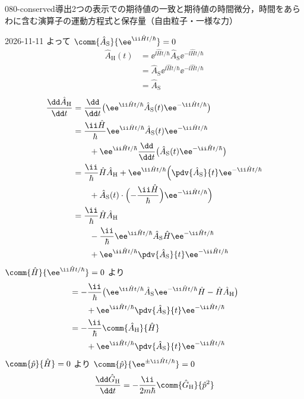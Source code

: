 \documentclass[uplatex,dvipdfmx,a4paper,11pt]{jsarticle}
\begin{document}
\begin{mondai}{080-conserved}{導出}{2つの表示での期待値の一致と期待値の時間微分，時間をあらわに含む演算子の運動方程式と保存量（自由粒子・一様な力）}
\begin{kotaeutsushi}{2026-11-11}
よって $\comm{\hat{A}_{\mathrm{S}}}{\ee^{\ii\hat{H}t/\hbar}}=0$
\begin{align*}
\hat{A}_{\mathrm{H}}(t)&=\ee^{\ii\hat{H}t/\hbar}\hat{A}_{\mathrm{S}}\ee^{-\ii\hat{H}t/\hbar}\\
&=\hat{A}_{\mathrm{S}}\ee^{\ii\hat{H}t/\hbar}\ee^{-\ii\hat{H}t/\hbar}\\
&=\hat{A}_{\mathrm{S}}
\end{align*}
\begin{align*}
\frac{\dd\hat{A}_{\mathrm{H}}}{\dd t}&=\frac{\dd}{\dd t}\bigl(\ee^{\ii\hat{H}t/\hbar}\hat{A}_{\mathrm{S}}(t)\ee^{-\ii\hat{H}t/\hbar}\bigr)\\
&=\frac{\ii\hat{H}}{\hbar}\ee^{\ii\hat{H}t/\hbar}\hat{A}_{\mathrm{S}}(t)\ee^{-\ii\hat{H}t/\hbar}\\
&\qquad+\ee^{\ii\hat{H}t/\hbar}\frac{\dd}{\dd t}\bigl(\hat{A}_{\mathrm{S}}(t)\ee^{-\ii\hat{H}t/\hbar}\bigr)\\
&=\frac{\ii}{\hbar}\hat{H}\hat{A}_{\mathrm{H}}+\ee^{\ii\hat{H}t/\hbar}\Bigl(\pdv{\hat{A}_{\mathrm{S}}}{t}\ee^{-\ii\hat{H}t/\hbar}\\
&\qquad+\hat{A}_{\mathrm{S}}(t)\cdot\Bigl(-\frac{\ii\hat{H}}{\hbar}\Bigr)\ee^{-\ii\hat{H}t/\hbar}\Bigr)\\
&=\frac{\ii}{\hbar}\hat{H}\hat{A}_{\mathrm{H}}\\
&\qquad-\frac{\ii}{\hbar}\ee^{\ii\hat{H}t/\hbar}\hat{A}_{\mathrm{S}}\hat{H}\ee^{-\ii\hat{H}t/\hbar}\\
&\qquad+\ee^{\ii\hat{H}t/\hbar}\pdv{\hat{A}_{\mathrm{S}}}{t}\ee^{-\ii\hat{H}t/\hbar}
\end{align*}
$\comm{\hat{H}}{\ee^{\ii\hat{H}t/\hbar}}=0$ より
\begin{align*}
&=-\frac{\ii}{\hbar}\bigl(\ee^{\ii\hat{H}t/\hbar}\hat{A}_{\mathrm{S}}\ee^{-\ii\hat{H}t/\hbar}\hat{H}-\hat{H}\hat{A}_{\mathrm{H}}\bigr)\\
&\qquad+\ee^{\ii\hat{H}t/\hbar}\pdv{\hat{A}_{\mathrm{S}}}{t}\ee^{-\ii\hat{H}t/\hbar}\\
&=-\frac{\ii}{\hbar}\comm{\hat{A}_{\mathrm{H}}}{\hat{H}}\\
&\qquad+\ee^{\ii\hat{H}t/\hbar}\pdv{\hat{A}_{\mathrm{S}}}{t}\ee^{-\ii\hat{H}t/\hbar}
\end{align*}
$\comm{\hat{p}}{\hat{H}}=0$ より $\comm{\hat{p}}{\ee^{\pm\ii\hat{H}t/\hbar}}=0$
\begin{align*}
\frac{\dd\hat{G}_{\mathrm{H}}}{\dd t}&=-\frac{\ii}{2m\hbar}\comm{\hat{G}_{\mathrm{H}}}{\hat{p}^{2}}\\

\end{align*}
\end{kotaeutsushi}
\end{mondai}
\end{document}
